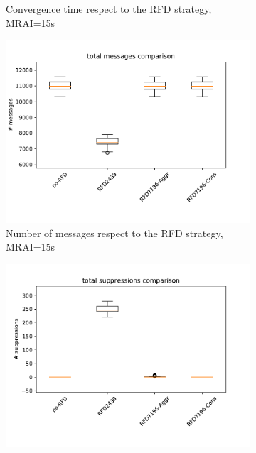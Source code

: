 \begin{figure}[H]
\begin{subfigure}[b]{0.325\textwidth}
         \caption{Convergence time respect to the RFD strategy, MRAI=15s}
         \label{fig:1000_RFD_MRAI30_time_mice}
     \end{subfigure}
     \hfill
     \begin{subfigure}[b]{0.325\textwidth}
         \centering
         \includegraphics[width=\textwidth]{images/RFD/miceVSelephants/MultiMRAI/15/mice/cisco_1000MRAI15_rfd_comparison_messages_boxplot.pdf}
         \caption{Number of messages respect to the RFD strategy, MRAI=15s}
         \label{fig:1000_RFD_MRAI30_messages_mice}
     \end{subfigure}
     \hfill
     \begin{subfigure}[b]{0.325\textwidth}
         \centering
         \includegraphics[width=\textwidth]{images/RFD/miceVSelephants/MultiMRAI/15/mice/cisco_1000MRAI15_rfd_comparison_suppressions_boxplot.pdf}

\end{subfigure}
\end{figure}
